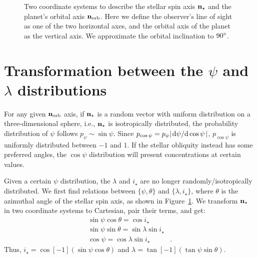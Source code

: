 \documentclass[twocolumn,times]{aastex631}
\begin{document}
\begin{figure*}[ht!]
    \vspace*{-1.5cm}
    \caption{Two coordinate systems to describe the stellar spin axis $\bf{n}_{\star}$ and the planet's orbital axis $\bf{n}_{\rm orb}$. Here we define the observer's line of sight as one of the two horizontal axes, and the orbital axis of the planet as the vertical axis. We approximate the orbital inclination to $90\mbox{$^\circ$}$.}
    \label{fig:coord}
\end{figure*}

\section{Transformation between the $\psi$ and $\lambda$ distributions}\label{sec:jacobian}

For any given $\bf{n}_{\rm orb}$ axis, if $\bf{n}_{\star}$ is a random vector with uniform distribution on a three-dimensional sphere, i.e., $\bf{n}_{\star}$ is isotropically distributed, the probability distribution of $\psi$ follows $p_{\psi} \sim \sin{\psi}$. Since $p_{\cos{\psi}} = p_{\psi} \abs{\dv*{\psi}{\cos{\psi}}}$, $p_{\cos{\psi}}$ is uniformly distributed between $-1$ and $1$. If the stellar obliquity instead has some preferred angles, the $\cos{\psi}$ distribution will present concentrations at certain values.

Given a certain $\psi$ distribution, the $\lambda$ and $i_\star$ are no longer randomly/isotropically distributed. We first find relations between $\{\psi, \theta\}$ and $\{\lambda, i_\star\}$, where $\theta$ is the azimuthal angle of the stellar spin axis, as shown in Figure~\ref{fig:coord}. We transform $\bf{n}_{\star}$ in two coordinate systems to Cartesian, pair their terms, and get:
\begin{align}
    \sin{\psi}\cos{\theta} = \cos{i_\star}& \label{eq:coord1}\\
    \sin{\psi}\sin{\theta} = \sin{\lambda}\sin{i_\star}& \label{eq:coord2}\\
    \cos{\psi} = \cos{\lambda}\sin{i_\star} \label{eq:coord3}&.
\end{align}
Thus, $i_\star = \cos[-1](\sin{\psi}\cos{\theta})$ and $\lambda = \tan[-1](\tan{\psi}\sin{\theta})$. 
\end{document}

